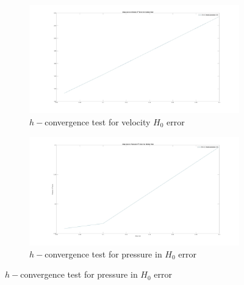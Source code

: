 \documentclass[a4paper,openany]{book}
\begin{document}
\begin{figure}
\begin{subfigure}{\textwidth}	
  \includegraphics[width=\linewidth]{h0_velocity_stokes.jpg}
  \caption{$h-$convergence test for velocity $H_0$ error}
  \label{fig:vel_stoke_conv_h0}
\end{subfigure}
\begin{subfigure}{\textwidth}	
  \includegraphics[width=\linewidth]{h0_pressure_stokes.jpg}
  \caption{$h-$convergence test for pressure in $H_0$ error}
  \label{fig:pre_stoke_conv_h0}
\end{subfigure}
\end{figure}
\end{document}
